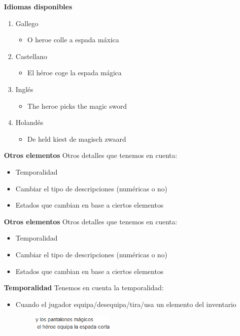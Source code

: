 \begin{frame}[t, fragile]{\textbf{Idiomas disponibles}}
	\begin{enumerate}
		\item Gallego
			\begin{itemize}
				\item O heroe colle a espada máxica
			\end{itemize}
		\item Castellano
			\begin{itemize}
				\item El héroe coge la espada mágica
			\end{itemize}
		\item Inglés
			\begin{itemize}
				\item The heroe picks the magic sword
			\end{itemize}
		\item Holandés
			\begin{itemize}
				\item De held kiest de magisch zwaard
			\end{itemize}
	\end{enumerate}
\end{frame}


\begin{tframe}{\textbf{Otros elementos}}
	Otros detalles que tenemos en cuenta:
	\begin{itemize}
		\item Temporalidad
		\item Cambiar el tipo de descripciones (numéricas o no)
		\item Estados que cambian en base a ciertos elementos
	\end{itemize}
\end{tframe}

\begin{tframe}{\textbf{Otros elementos}}
	Otros detalles que tenemos en cuenta:
	\begin{itemize}
		\item<+-| alert@+> Temporalidad
		\item Cambiar el tipo de descripciones (numéricas o no)
		\item Estados que cambian en base a ciertos elementos
	\end{itemize}
\end{tframe}

\begin{tframe}{\textbf{Temporalidad}}
	Tenemos en cuenta la temporalidad:
	\begin{itemize}
		\item<+-| alert@+> Cuando el jugador equipa/desequipa/tira/usa un elemento del inventario
		\begin{figure}[h]
			\includegraphics[width=4cm]{../img/temporalidadEquipar.PNG}
		\end{figure}
	\end{itemize}
\end{tframe}

